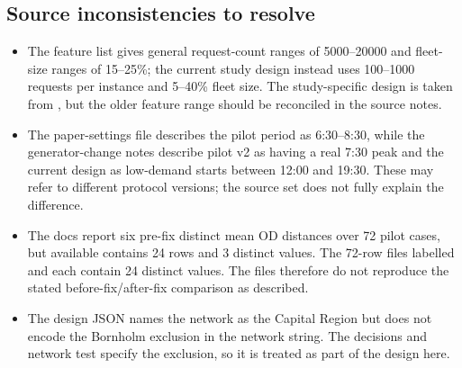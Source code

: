 \subsection{Source inconsistencies to resolve}

\begin{itemize}
\item The feature list gives general request-count ranges of 5000--20000 and
  fleet-size ranges of 15--25\%; the current study design instead uses
  100--1000 requests per instance and 5--40\% fleet size. The study-specific
  design is taken from , but the older feature
  range should be reconciled in the source notes.
\item The paper-settings file describes the pilot period as 6:30--8:30, while
  the generator-change notes describe pilot v2 as having a real 7:30 peak and
  the current design as low-demand starts between 12:00 and 19:30. These may
  refer to different protocol versions; the source set does not fully explain
  the difference.
\item The docs report six pre-fix distinct mean OD distances over 72 pilot
  cases, but available 
  contains 24 rows and 3 distinct values. The 72-row files labelled
   and  each contain 24 distinct
  values. The files therefore do not reproduce the stated before-fix/after-fix
  comparison as described.
\item The design JSON names the network as the Capital Region but does not
  encode the Bornholm exclusion in the network string. The decisions and
  network test specify the exclusion, so it is treated as part of the design
  here.
\end{itemize}
